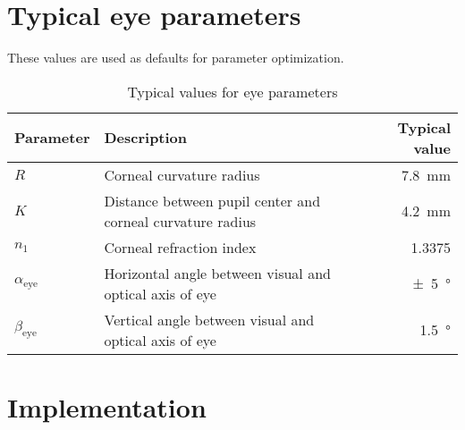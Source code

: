 \documentclass[a4paper, 12pt]{article}
\begin{document}
\section{Typical eye parameters}

These values are used as defaults for parameter optimization.

\begin{table}[h!]
    \centering
    \caption{Typical values for eye parameters}
    \begin{tabularx}{\textwidth}{l X r}
        \toprule
        Parameter             & Description                                                & Typical value       \\
        \midrule
        $R$                   & Corneal curvature radius                                   & \SI{7.8}{\mm}       \\
        $K$                   & Distance between pupil center and corneal curvature radius & \SI{4.2}{\mm}       \\
        $n_1$                 & Corneal refraction index                                   & \num{1.3375}        \\
        $\alpha_{\text{eye}}$ & Horizontal angle between visual and optical axis of eye    & \SI{\pm 5}{\degree} \\
        $\beta_{\text{eye}}$  & Vertical angle between visual and optical axis of eye      & \SI{1.5}{\degree}   \\
        \bottomrule
    \end{tabularx}
\end{table}

\section{Implementation}
\end{document}
